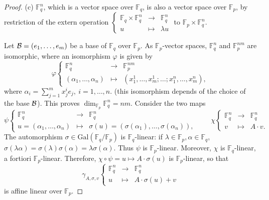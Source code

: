 \documentclass[11pt,a4paper]{article}
\newcommand{\F}{\mathbb{F}}
\newcommand{\Gal}{\mathrm{Gal}}
\begin{document}
\begin{proof}
\item[(c)]  $\F_q^n$, which is a vector space over $\F_q$, is also a vector space over $\F_p$, by restriction of the extern operation 
$
\left\{
\begin{array}{ccc}
\F_q \times \F_q^n & \to & \F_q^n\\
u & \mapsto &\lambda u
\end{array}
\right.
$
to $\F_p \times \F_q^n$.

Let ${\cal B} = (e_1,\ldots,e_m)$ be a base of $\F_q$ over $\F_p$.
As $\F_p$-vector spaces, $\F_q^n$ and $\F_p^{nm}$ are isomorphic, where an isomorphism $\varphi$ is given by
$$
\varphi \left\{
\begin{array}{ccc}
\F_q^n & \to & \F_p^{nm}\\
(\alpha_1,\ldots,\alpha_n)& \mapsto &(x_1^1,\ldots,x_m^1;\ldots;x_1^n,\ldots,x_m^n),
\end{array}
\right.
$$
where $\alpha_i = \sum_{j=1}^m x_j^i e_j,\ i=1,\ldots,n.$ (this isomorphism depends of the choice of the base $\cal B$). This proves $\dim_{\F_p} \F_q^n = nm$.
Consider the two maps
$$
\psi
\left\{
\begin{array}{ccc}
\F_q^n &\to &\F_q^n\\
u  = (\alpha_1,\ldots,\alpha_n)& \mapsto &\sigma(u) = (\sigma(\alpha_1),\ldots,\sigma(\alpha_n)),
\end{array}
\right.
\qquad 
\chi
\left\{
\begin{array}{ccc}
\F_q^n &\to &\F_q^n\\
v& \mapsto &A \cdot v.
\end{array}
\right.
$$
The automorphism $\sigma \in \Gal(\F_q/\F_p)$ is $\F_q$-linear: if $\lambda \in \F_p, \alpha \in \F_q$, $\sigma(\lambda \alpha) = \sigma(\lambda) \sigma(\alpha) = \lambda \sigma(\alpha)$. Thus $\psi$ is $\F_p$-linear. Moreover, $\chi$ is $\F_q$-linear, a fortiori $\F_p$-linear. Therefore, $\chi \circ \psi = u \mapsto A\cdot \sigma(u)$ is $\F_p$-linear, so that
$$
\gamma_{A,\sigma,v}
\left\{
\begin{array}{ccc}
\F_q^n & \to & \F_q^n\\
u &\mapsto & A\cdot \sigma(u) + v
\end{array}
\right.
$$
is affine linear over $\F_p$.
 \end{proof}
 
 
\end{document}
